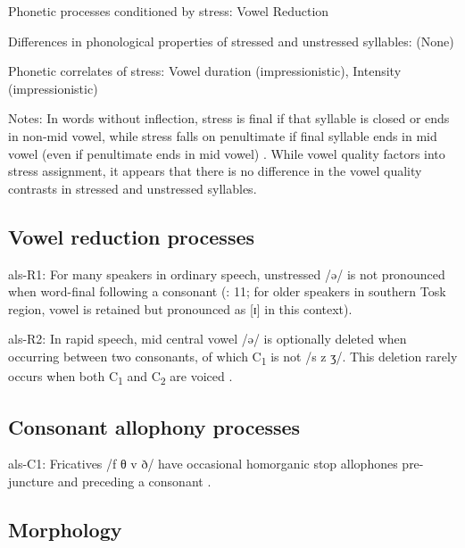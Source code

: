 {\begin{appendixdesc}
\item[Phonetic processes conditioned by stress:] Vowel Reduction

\item[Differences in phonological properties of stressed and unstressed syllables:] (None)

\item[Phonetic correlates of stress:] Vowel duration (impressionistic), Intensity (impressionistic)

\item[Notes:] In words without inflection, stress is final if that syllable is closed or ends in non-mid vowel, while stress falls on penultimate if final syllable ends in mid vowel (even if penultimate ends in mid vowel) \citep{Trommer2013}. While vowel quality factors into stress assignment, it appears that there is no difference in the vowel quality contrasts in stressed and unstressed syllables.
\end{appendixdesc}
\subsection*{Vowel reduction processes}
\begin{appendixdesc}

\item[als-R1:] For many speakers in ordinary speech, unstressed /ə/ is not pronounced when word-final following a consonant (\citealt{NewmarkEtAl1982}: 11; for older speakers in southern Tosk region, vowel is retained but pronounced as [ɪ] in this context).

\item[als-R2:] In rapid speech, mid central vowel /ə/ is optionally deleted when occurring between two consonants, of which C\textsubscript{1} is not /s z ʒ/. This deletion rarely occurs when both C\textsubscript{1} and C\textsubscript{2} are voiced \citep[21--22]{Klippenstein2010}.
\end{appendixdesc}
\subsection*{Consonant allophony processes}
\begin{appendixdesc}

\item[als-C1:] Fricatives /f θ v ð/ have occasional homorganic stop allophones pre-juncture and preceding a consonant \citep{Newmark1957}.
\end{appendixdesc}
\subsection*{Morphology}

}

